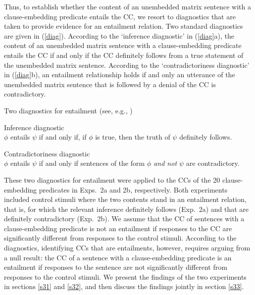 \documentclass[11pt,fleqn]{article}
\newcommand{\6}{\mbox{$[\hspace*{-.6mm}[$}}
\newcommand{\9}{\mbox{$]\hspace*{-.6mm}]$}}
\begin{document}
Thus, to establish whether the content of an unembedded matrix sentence with a clause-embedding predicate entails the CC, we resort to diagnostics that are taken to provide evidence for an entailment relation. Two standard diagnostics are given in (\ref{diag}). According to the `inference diagnostic' in (\ref{diag}a), the content of an unembedded matrix sentence with a clause-embedding predicate entails the CC if and only if the CC definitely follows from a true statement of the unembedded matrix sentence. According to the `contradictoriness diagnostic' in (\ref{diag}b), an entailment relationship holds if and only an utterance of the unembedded matrix sentence that is followed by a denial of the CC is contradictory. 

\begin{exe}
\ex\label{diag} Two diagnostics for entailment \hfill (see, e.g., \citealt[\S3.1]{ccmg90})
\begin{xlist}
\ex  Inference diagnostic \\ $\phi$ entails $\psi$ if and only if, if $\phi$ is true, then the truth of $\psi$ definitely follows. 

\ex  Contradictoriness diagnostic \\ $\phi$ entails $\psi$ if and only if sentences of the form {\em $\phi$ and not $\psi$} are contradictory. 

\end{xlist}
\end{exe}
These two diagnostics for entailment were applied to the CCs of the 20 clause-embedding predicates in Exps.~2a and 2b, respectively. Both experiments included control stimuli where the two contents stand in an entailment relation, that is, for which the relevant inference definitely follows (Exp.~2a) and that are definitely contradictory (Exp.~2b). We assume that the CC of sentences with a clause-embedding predicate is not an entailment if responses to the CC are significantly different from responses to the control stimuli. According to the diagnostics, identifying CCs that are entailments, however, requires arguing from a null result: the CC of a sentence with a clause-embedding predicate is an entailment if responses to the sentence are not significantly different from responses to the control stimuli. We present the findings of the two experiments in sections \ref{s31} and \ref{s32}, and then discuss the findings jointly in section \ref{s33}.
\end{document}
